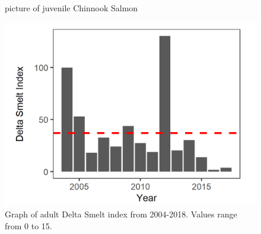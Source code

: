 \documentclass[
]{book}
\begin{document}
\begin{panel-grid}
\begin{columns-nocenter}
\begin{column800}
\begin{figure}
{}

\caption{picture of juvenile Chinnook Salmon}\label{fig:unnamed-chunk-181}
\end{figure}

\end{column800}

\end{columns-nocenter}

\begin{columns-nocenter}

\begin{column800}

\begin{expand}

\begin{figure}
\includegraphics[width=15.25in]{figures/skt_dsm_fig_meanline} \caption{Graph of adult Delta Smelt index from 2004-2018. Values range from 0 to 15.}\label{fig:unnamed-chunk-182}
\end{figure}

\end{expand}

\end{column800}

\begin{column40}

~

\end{column40}

\begin{column800}

\begin{expand}


\end{expand}
\end{column800}
\end{columns-nocenter}
\end{panel-grid}
\end{document}
